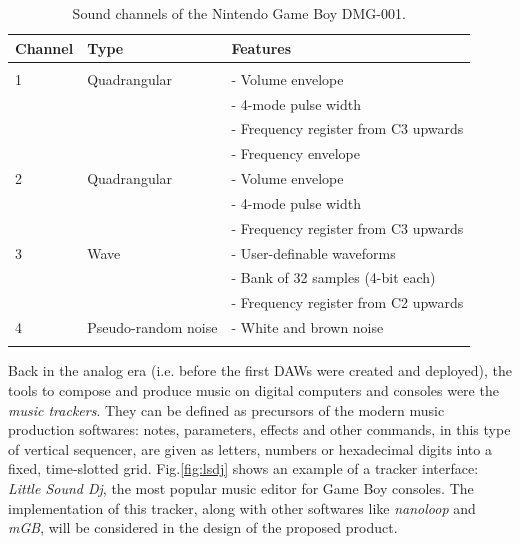 \documentclass[]{article}
\begin{document}
        \def\arraystretch{1.2}
        \begin{table}[h!]
            \begin{tabular}{l l l}
                \hline
                \textbf{Channel} & \textbf{Type} & \textbf{Features}\\
                \hline \\[-6pt]
                1 & Quadrangular\footnotemark & - Volume envelope\\
                    &   &                                                                          - 4-mode pulse width\\
                    &   &                                                                          - Frequency register from C3 upwards\\
                    &   &                                                                          - Frequency envelope\\            
                \hline
                2 & Quadrangular & - Volume envelope\\       
                &   &              - 4-mode pulse width\\
                &   &              - Frequency register from C3 upwards\\
                \hline
                3 & Wave & - User-definable waveforms\\
                &   &      - Bank of 32 samples (4-bit each)\\
                &   &      - Frequency register from C2 upwards\\
                \hline
                4 & Pseudo-random noise & - White and brown noise\\
                \hline \\
            \end{tabular}
            \caption{Sound channels of the Nintendo Game Boy DMG-001.}
        \end{table}
        
        \nocite{MARQUEZ2014}

        Back in the analog era (i.e. before the first DAWs were created and deployed), the tools to compose and produce music on digital 
        computers and consoles were the \emph{music trackers}. They can be defined as precursors of the modern 
        music production softwares: notes, parameters, effects and other commands, in this type of vertical sequencer, are given
        as letters, numbers or hexadecimal digits into a fixed, time-slotted grid. Fig.\ref{fig:lsdj} shows an
        example of a tracker interface: \emph{Little Sound Dj}, the most popular music editor for 
        Game Boy consoles. The implementation of this tracker, along with other softwares like \emph{nanoloop} 
        and \emph{mGB}, will be considered in the design of the proposed product. \\
\end{document}

